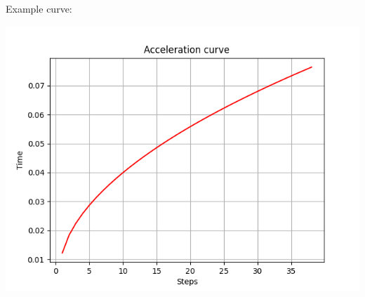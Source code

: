 \documentclass{article}
\begin{document}
    Example curve:
    \begin{center}
        \includegraphics[scale=0.75]{../test/data/Curve1.png}
    \end{center}
\end{document}
